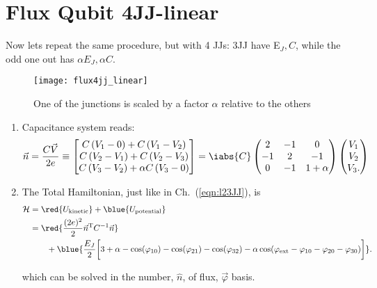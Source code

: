 
\newpage
\section{Flux Qubit 4JJ-linear}
\label{sec:flux-qubit-4jj}

Now lets repeat the same procedure, but with 4 JJs: 3JJ have E$_{J}, C$, while the odd one out
has $\alpha E_J, \alpha C$.

\begin{figure}[h]
  \centering \texttt{[image: flux4jj\_linear]}
  \caption{\small  One  of  the  junctions  is  scaled   by  a  factor  $\alpha$  relative  to  the
    others \label{fig:flux4jj_linear}}
\end{figure}


\begin{enumerate}
\item Capacitance system reads:
  \begin{equation}
    \label{eq:4jjlinear_1}
    \vec{n} = \frac{C\vec{V}}{2e} \equiv \begin{bmatrix}
      C\left(V_1-0\right) + C\left(V_1-V_2\right) \\
      C\left(V_2-V_1\right) + C\left(V_2-V_3\right) \\
      C\left(V_3-V_2\right) + \alpha C\left(V_3-0\right) \\
    \end{bmatrix} = \iabs{C} \begin{pmatrix}
      2 & -1 & 0\\
      -1 & 2 & -1\\
      0 & -1 & 1 + \alpha
    \end{pmatrix}\begin{pmatrix}
      V_{1}\\V_2\\V_{3}.
    \end{pmatrix}
  \end{equation}

  \noindent
\item The Total Hamiltonian, just like in Ch.~(\ref{eqn:l23JJ}), is
  \begin{equation}
    \label{eq:4jjlinear_2}
    \begin{aligned}
      \mathcal{H} & = \red{U_{\text{kinetic}}} + \blue{U_{\text{potential}}}\\ & =
      \red{\frac{(2e)^2}{2}\vec{n}^{\text{T}}C^{-1}\vec{n}} \\
      &  \qquad +  \blue{\frac{E_J}{2}\bigg[3+\alpha  -  \cos(\varphi_{10}) -  \cos(\varphi_{21})  - \cos(\varphi_{32})  -
        \alpha\cos(\varphi_\text{ext}-\varphi_{10} - \varphi_{20} - \varphi_{30})\bigg]}.
    \end{aligned}
  \end{equation}

  \noindent which can be solved in the number, $ \hat{n} $, of flux, $ \vec{\varphi} $ basis.
\end{enumerate}

